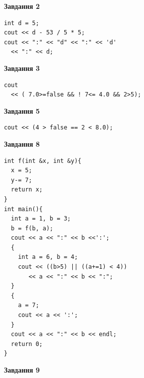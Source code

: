 \documentclass[12pt, ukrainian]{article}
\begin{document}
{\begin {large}
\begin{minipage}[t]{7.0cm}
\end{minipage}
\vline \hspace{1mm}
\begin{minipage}[t]{11.0cm}

\begin{center}
\textbf{Завдання 2}
\end{center}
\vspace{-8mm}

\begin{verbatim}
int d = 5;
cout << d - 53 / 5 * 5;
cout << ":" << "d" << ":" << 'd' 
  << ":" << d;
\end{verbatim}



\begin{center}
\textbf{Завдання 3}
\end{center}
\vspace{-8mm}

\begin{verbatim}
cout 
  << ( 7.0>=false && ! 7<= 4.0 && 2>5);
\end{verbatim}



\begin{center}
\textbf{Завдання 5}
\end{center}
\vspace{-8mm}

\begin{verbatim}
cout << (4 > false == 2 < 8.0);
\end{verbatim}



\begin{center}
\textbf{Завдання 8}
\end{center}
\vspace{-8mm}

\begin{verbatim}
int f(int &x, int &y){
  x = 5;
  y-= 7;
  return x;
}
int main(){
  int a = 1, b = 3;
  b = f(b, a);
  cout << a << ":" << b <<':';
  {
    int a = 6, b = 4;
    cout << ((b>5) || ((a+=1) < 4))
       << a << ":" << b << ":";
  }
  {
    a = 7;
    cout << a << ':';
  }
  cout << a << ":" << b << endl;
  return 0;
}
\end{verbatim}

\end{minipage}


\begin{minipage}[t]{7.0cm}

\begin{center}
\textbf{Завдання 9}
\end{center}
\vspace{-8mm}


\end{minipage}
\end{large}}
\end{document}
